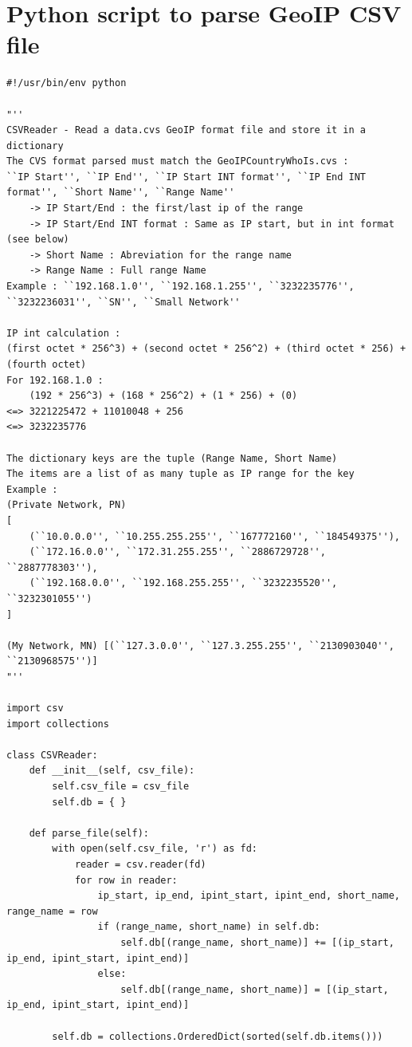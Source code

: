 \documentclass{koala-en}
\begin{document}
\section{Python script to parse GeoIP CSV file}
\begin{lstlisting}
#!/usr/bin/env python

"''
CSVReader - Read a data.cvs GeoIP format file and store it in a dictionary
The CVS format parsed must match the GeoIPCountryWhoIs.cvs :
``IP Start'', ``IP End'', ``IP Start INT format'', ``IP End INT format'', ``Short Name'', ``Range Name''
    -> IP Start/End : the first/last ip of the range
    -> IP Start/End INT format : Same as IP start, but in int format (see below)
    -> Short Name : Abreviation for the range name
    -> Range Name : Full range Name
Example : ``192.168.1.0'', ``192.168.1.255'', ``3232235776'', ``3232236031'', ``SN'', ``Small Network''

IP int calculation :
(first octet * 256^3) + (second octet * 256^2) + (third octet * 256) + (fourth octet)
For 192.168.1.0 :
    (192 * 256^3) + (168 * 256^2) + (1 * 256) + (0)
<=> 3221225472 + 11010048 + 256
<=> 3232235776

The dictionary keys are the tuple (Range Name, Short Name)
The items are a list of as many tuple as IP range for the key
Example :
(Private Network, PN)
[
    (``10.0.0.0'', ``10.255.255.255'', ``167772160'', ``184549375''),
    (``172.16.0.0'', ``172.31.255.255'', ``2886729728'', ``2887778303''),
    (``192.168.0.0'', ``192.168.255.255'', ``3232235520'', ``3232301055'')
]

(My Network, MN) [(``127.3.0.0'', ``127.3.255.255'', ``2130903040'', ``2130968575'')]
"''

import csv
import collections

class CSVReader:
    def __init__(self, csv_file):
        self.csv_file = csv_file
        self.db = { }

    def parse_file(self):
        with open(self.csv_file, 'r') as fd:
            reader = csv.reader(fd)
            for row in reader:
                ip_start, ip_end, ipint_start, ipint_end, short_name, range_name = row
                if (range_name, short_name) in self.db:
                    self.db[(range_name, short_name)] += [(ip_start, ip_end, ipint_start, ipint_end)]
                else:
                    self.db[(range_name, short_name)] = [(ip_start, ip_end, ipint_start, ipint_end)]

        self.db = collections.OrderedDict(sorted(self.db.items()))


\end{lstlisting}
\end{document}
